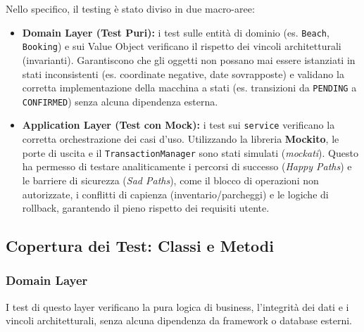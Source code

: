 \documentclass[a4paper,11pt]{article}
\begin{document}
Nello specifico, il testing è stato diviso in due macro-aree:

\begin{itemize}
	\item \textbf{Domain Layer (Test Puri):} i test sulle entità di dominio (es. \texttt{Beach}, \texttt{Booking}) e sui Value Object verificano il rispetto dei vincoli architetturali (invarianti). Garantiscono che gli oggetti non possano mai essere istanziati in stati inconsistenti (es. coordinate negative, date sovrapposte) e validano la corretta implementazione della macchina a stati (es. transizioni da \texttt{PENDING} a \texttt{CONFIRMED}) senza alcuna dipendenza esterna.
	
	\item \textbf{Application Layer (Test con Mock):} i test sui \texttt{service} verificano la corretta orchestrazione dei casi d'uso. Utilizzando la libreria \textbf{Mockito}, le porte di uscita e il \texttt{TransactionManager} sono stati simulati (\textit{mockati}). Questo ha permesso di testare analiticamente i percorsi di successo (\textit{Happy Paths}) e le barriere di sicurezza (\textit{Sad Paths}), come il blocco di operazioni non autorizzate, i conflitti di capienza (inventario/parcheggi) e le logiche di rollback, garantendo il pieno rispetto dei requisiti utente.
\end{itemize}

\subsection{Copertura dei Test: Classi e Metodi}

\subsubsection*{Domain Layer}
I test di questo layer verificano la pura logica di business, l'integrità dei dati e i vincoli architetturali, senza alcuna dipendenza da framework o database esterni.
\end{document}
